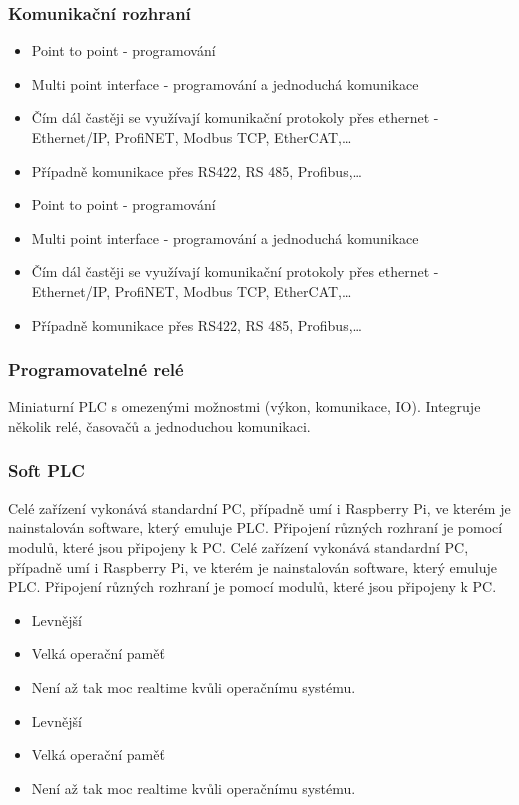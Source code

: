 \subsubsection*{Komunikační rozhraní}
\begin{itemize}
  \item Point to point - programování
  \item Multi point interface - programování a jednoduchá komunikace
  \item Čím dál častěji se využívají komunikační protokoly přes ethernet - Ethernet/IP, ProfiNET, Modbus TCP, EtherCAT,\dots
  \item Případně komunikace přes RS422, RS 485, Profibus,\dots
    \item Point to point - programování
    \item Multi point interface - programování a jednoduchá komunikace
    \item Čím dál častěji se využívají komunikační protokoly přes ethernet - Ethernet/IP, ProfiNET, Modbus TCP, EtherCAT,\dots
    \item Případně komunikace přes RS422, RS 485, Profibus,\dots
\end{itemize}

\subsubsection*{Programovatelné relé}
Miniaturní PLC s omezenými možnostmi (výkon, komunikace, IO). Integruje několik relé, časovačů a jednoduchou komunikaci.

\subsubsection*{Soft PLC}
Celé zařízení vykonává standardní PC, případně umí i Raspberry Pi, ve kterém je nainstalován software, který emuluje PLC. Připojení různých rozhraní je pomocí modulů, které jsou připojeny k PC. 
Celé zařízení vykonává standardní PC, případně umí i Raspberry Pi, ve kterém je nainstalován software, který emuluje PLC. Připojení různých rozhraní je pomocí modulů, které jsou připojeny k PC.
\begin{itemize}
  \item Levnější
  \item Velká operační paměť
  \item Není až tak moc realtime kvůli operačnímu systému.
    \item Levnější
    \item Velká operační paměť
    \item Není až tak moc realtime kvůli operačnímu systému.
\end{itemize}

